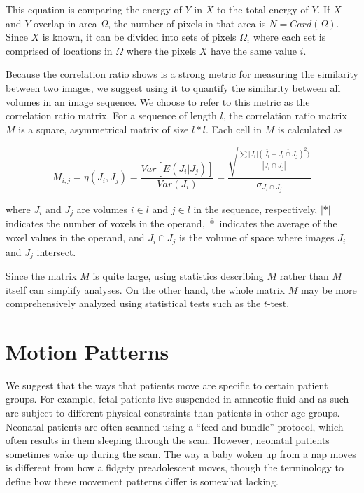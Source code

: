 This equation is comparing the energy of $Y$ in $X$ to the total energy of $Y$. If $X$ and $Y$ overlap in area $\Omega$, the number of pixels in that area is $N = Card(\Omega)$. Since $X$ is known, it can be divided into sets of pixels $\Omega_i$ where each set is comprised of locations in $\Omega$ where the pixels $X$ have the same value $i$. 

Because the correlation ratio shows is a strong metric for measuring the similarity between two images, we suggest using it to quantify the similarity between all volumes in an image sequence. We choose to refer to this metric as the correlation ratio matrix. For a sequence of length $l$, the correlation ratio matrix $M$ is a square, asymmetrical matrix of size $l*l$. Each cell in $M$ is calculated as

\begin{equation}
M_{i,j} = \eta(J_i, J_j) = \frac{Var[E(J_i|J_j)]}{Var(J_i)} =  \frac{\sqrt{\frac{\sum |J_i|(\overline{J_i} - \overline{J_i \cap J_j})^2)}{|J_i \cap J_j|}}}{\sigma_{J_i \cap J_j}}
\end{equation}

where $J_i$ and $J_j$ are volumes $i \in l$ and $j \in l$ in the sequence, respectively, $|*|$ indicates the number of voxels in the operand, $\overline{*}$ indicates the average of the voxel values in the operand, and $J_i \cap J_j$ is the volume of space where images $J_i$ and $J_j$ intersect. %

Since the matrix $M$ is quite large, using statistics describing $M$ rather than $M$ itself can simplify analyses. On the other hand, the whole matrix $M$ may be more comprehensively analyzed using statistical tests such as the $t$-test.




\section{Motion Patterns} 

We suggest that the ways that patients move are specific to certain patient groups. For example, fetal patients live suspended in amneotic fluid and as such are subject to different physical constraints than patients in other age groups. Neonatal patients are often scanned using a ``feed and bundle'' protocol, which often results in them sleeping through the scan. However, neonatal patients sometimes wake up during the scan. The way a baby woken up from a nap moves is different from how a fidgety preadolescent moves, though the terminology to define how these movement patterns differ is somewhat lacking. 

